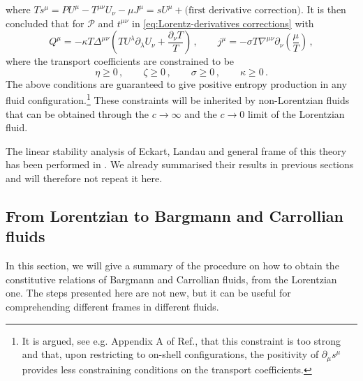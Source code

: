 \documentclass[superscriptaddress,prd,nofootinbib,preprintnumbers,longbibliography,11pt,eqsecnum]{revtex4-1}
\def\d{\partial}
\def\CP{\mathcal{P}}
\begin{document}
where $T s^\mu = P U^\mu - T^{\mu \nu}U_\nu - \mu J^\mu = s U^\mu +\text{(first derivative correction)}$. It is then concluded that for $\CP$ and $t^{\mu \nu}$ in \eqref{eq:Lorentz-derivatives corrections} with 
\begin{equation}
  Q^\mu = -\kappa T \Delta^{\mu \nu} \left( T U^\lambda\d_\lambda U_\nu + \frac{\d_\nu T}{T} \right)\, ,\qquad j^\mu = - \sigma T \nabla^{\mu \nu} \d_\nu \left( \frac{\mu}{T} \right)\, ,
\end{equation}
where the transport coefficients are constrained to be 
\begin{equation}
  \eta \ge 0 \, , \qquad \zeta \ge 0 \, , \qquad \sigma \ge 0 \, ,\qquad \kappa \ge 0\,.
\end{equation}
The above conditions are guaranteed to give positive entropy production in any fluid configuration.\footnote{It is argued, see e.g. Appendix A of Ref.\cite{Kovtun:2019hdm}, that this constraint is too strong and that, upon restricting to on-shell configurations, the positivity of $\d_\mu s^\mu$ provides less constraining conditions on the transport coefficients.} These constraints will be inherited by non-Lorentzian fluids that can be obtained through the $c\to \infty$ and the $c\to 0$ limit of the Lorentzian fluid. 

The linear stability analysis of Eckart, Landau and general frame of this theory has been performed in \cite{Hiscock:1985zz}. We already summarised their results in previous sections and will therefore not repeat it here. 



\subsection{From Lorentzian to Bargmann and Carrollian fluids}\label{sec:technicalOverview-Bargmann}

In this section, we will give a summary of the procedure on how to obtain the constitutive relations of Bargmann and Carrollian fluids, from the Lorentzian one. The steps presented here are not new, but it can be useful for comprehending different frames in different fluids.
\end{document}
